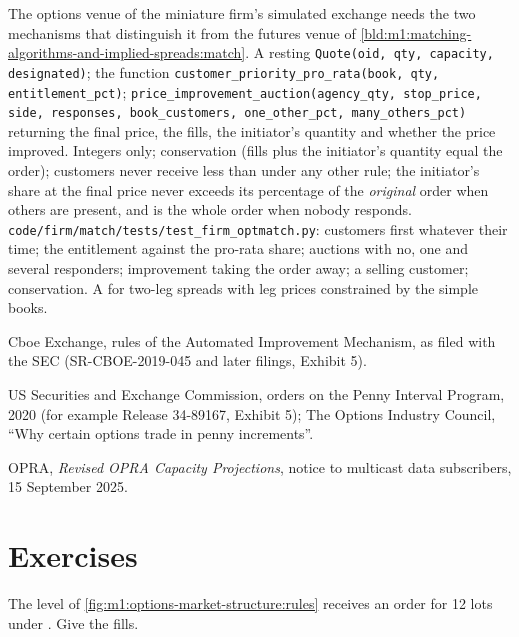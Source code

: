 \begin{build}
 The options venue of the miniature firm's simulated
exchange needs the two mechanisms that distinguish it from the futures
venue of \cref{bld:m1:matching-algorithms-and-implied-spreads:match}.
 A resting \texttt{Quote(oid, qty, capacity, designated)};
the function \texttt{customer\_priority\_pro\_rata(book, qty, entitlement\_pct)};
\texttt{price\_improvement\_auction(agency\_qty, stop\_price, side, responses,
book\_customers, one\_other\_pct, many\_others\_pct)} returning the final price,
the fills, the initiator's quantity and whether the price improved.
 Integers only; conservation (fills plus the initiator's
quantity equal the order); customers never receive less than under any other
rule; the initiator's share at the final price never exceeds its percentage of
the \emph{original} order when others are present, and is the whole order when
nobody responds.
 \texttt{code/firm/match/tests/test\_firm\_optmatch.py}:
customers first whatever their time; the entitlement against the pro-rata
share; auctions with no, one and several responders; improvement taking the
order away; a selling customer; conservation.
 A  for two-leg spreads with leg prices
constrained by the simple books.
\end{build}

\begin{omsources}
\item Cboe Exchange, rules of the Automated Improvement Mechanism, as filed
with the SEC (SR-CBOE-2019-045 and later filings, Exhibit 5).
\item US Securities and Exchange Commission, orders on the Penny Interval
Program, 2020 (for example Release 34-89167, Exhibit 5); The Options Industry
Council, ``Why certain options trade in penny increments''.
\item OPRA, \emph{Revised OPRA Capacity Projections}, notice to multicast
data subscribers, 15 September 2025.
\end{omsources}

\section{Exercises}

\begin{exercise}[$\star$]\label{exo:m1:options-market-structure:1}
The level of \cref{fig:m1:options-market-structure:rules} receives an order
for 12 lots under . Give the fills.
\end{exercise}

